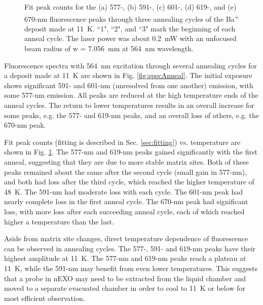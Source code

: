 \begin{figure}
                \caption{Fit peak counts for the (a) 577-, (b) 591-, (c) 601-, (d) 619-, and (e) 670-nm fluorescence peaks through three annealing cycles of the Ba\textsuperscript{+} deposit made at 11~K.  ``1", ``2", and ``3" mark the beginning of each anneal cycle.  The laser power was about 0.2~mW with an unfocused beam radius of w = 7.056~mm at 564~nm wavelength.}
\label{fig:annealGrn}
\end{figure}

Fluorescence spectra with 564~nm excitation through several annealing cycles for a deposit made at 11~K are shown in Fig. \ref{fig:specAnneal}.  The initial exposure shows significant 591- and 601-nm (unresolved from one another) emission, with some 577-nm emission.  All peaks are reduced at the high temperature ends of the anneal cycles.  The return to lower temperatures results in an overall increase for some peaks, e.g. the 577- and 619-nm peaks, and an overall loss of others, e.g. the 670-nm peak.  

Fit peak counts (fitting is described in Sec. \ref{sec:fitting}) vs. temperature are shown in Fig. \ref{fig:annealGrn}.  The 577-nm and 619-nm peaks gained significantly with the first anneal, suggesting that they are due to more stable matrix sites.  Both of these peaks remained about the same after the second cycle (small gain in 577-nm), and both had loss after the third cycle, which reached the higher temperature of 48~K.  The 591-nm had moderate loss with each cycle.  The 601-nm peak had nearly complete loss in the first anneal cycle.  The 670-nm peak had significant loss, with more loss after each succeeding anneal cycle, each of which reached higher a temperature than the last.




Aside from matrix site changes, direct temperature dependence of fluorescence can be observed in annealing cycles.  The 577-, 591- and 619-nm peaks have their highest amplitude at 11~K.  The 577-nm and 619-nm peaks reach a plateau at 11~K, while the 591-nm may benefit from even lower temperatures.  This suggests that a probe in nEXO may need to be extracted from the liquid chamber and moved to a separate evacuated chamber in order to cool to 11~K or below for most efficient observation.  

